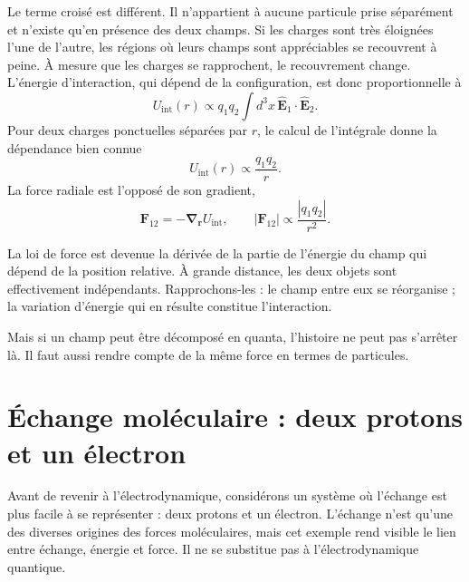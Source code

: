 Le terme croisé est différent. Il n’appartient à aucune particule prise séparément et n’existe qu’en présence des deux champs. Si les charges sont très éloignées l’une de l’autre, les régions où leurs champs sont appréciables se recouvrent à peine. À mesure que les charges se rapprochent, le recouvrement change. L’énergie d’interaction, qui dépend de la configuration, est donc proportionnelle à
\begin{equation}
U_{\text{int}}(r)\propto q_1q_2\int d^3x\,
\widehat{\mathbf E}_1\!\cdot\!\widehat{\mathbf E}_2.
\end{equation}
Pour deux charges ponctuelles séparées par \(r\), le calcul de l’intégrale donne la dépendance bien connue
\begin{equation}
U_{\text{int}}(r)\propto\frac{q_1q_2}{r}.
\end{equation}
La force radiale est l’opposé de son gradient,
\begin{equation}
\mathbf F_{12}=-\boldsymbol\nabla_{\mathbf r}U_{\text{int}},
\qquad
|\mathbf F_{12}|\propto\frac{|q_1q_2|}{r^2}.
\end{equation}

La loi de force est devenue la dérivée de la partie de l’énergie du champ qui dépend de la position relative. À grande distance, les deux objets sont effectivement indépendants. Rapprochons-les : le champ entre eux se réorganise ; la variation d’énergie qui en résulte constitue l’interaction.

Mais si un champ peut être décomposé en quanta, l’histoire ne peut pas s’arrêter là. Il faut aussi rendre compte de la même force en termes de particules.

\section{Échange moléculaire : deux protons et un électron}

Avant de revenir à l’électrodynamique, considérons un système où l’échange est plus facile à se représenter : deux protons et un électron. L’échange n’est qu’une des diverses origines des forces moléculaires, mais cet exemple rend visible le lien entre échange, énergie et force. Il ne se substitue pas à l’électrodynamique quantique.

